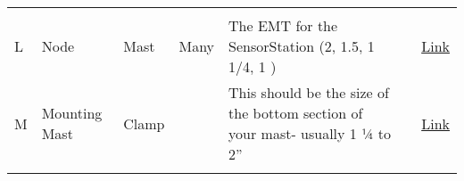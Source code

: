 \documentclass[
]{article}
\begin{document}
\begin{longtable}[]{@{}lllllll@{}}
\begin{minipage}[t]{0.12\columnwidth}
\end{minipage}\tabularnewline
\begin{minipage}[t]{0.12\columnwidth}\raggedright
L\strut
\end{minipage} & \begin{minipage}[t]{0.12\columnwidth}\raggedright
Node\strut
\end{minipage} & \begin{minipage}[t]{0.12\columnwidth}\raggedright
Mast\strut
\end{minipage} & \begin{minipage}[t]{0.12\columnwidth}\raggedright
Many\strut
\end{minipage} & \begin{minipage}[t]{0.12\columnwidth}\raggedright
The EMT for the SensorStation (2, 1.5, 1 1/4, 1 )\strut
\end{minipage} & \begin{minipage}[t]{0.12\columnwidth}\raggedright
\strut
\end{minipage} & \begin{minipage}[t]{0.12\columnwidth}\raggedright
\href{https://www.lowes.com/pd/Common-3-4-in-Actual-75-In-Metallic-Emt-10-ft-Conduit/3129553}{Link}\strut
\end{minipage}\tabularnewline
\begin{minipage}[t]{0.12\columnwidth}\raggedright
M\strut
\end{minipage} & \begin{minipage}[t]{0.12\columnwidth}\raggedright
Mounting Mast\strut
\end{minipage} & \begin{minipage}[t]{0.12\columnwidth}\raggedright
Clamp\strut
\end{minipage} & \begin{minipage}[t]{0.12\columnwidth}\raggedright
\strut
\end{minipage} & \begin{minipage}[t]{0.12\columnwidth}\raggedright
This should be the size of the bottom section of your mast- usually 1 ¼
to 2''\strut
\end{minipage} & \begin{minipage}[t]{0.12\columnwidth}\raggedright
\strut
\end{minipage} & \begin{minipage}[t]{0.12\columnwidth}\raggedright
\href{https://www.lowes.com/search?searchTerm=universal+strut+pipe+strap}{Link}\strut
\end{minipage}\tabularnewline
\begin{minipage}[t]{0.12\columnwidth}\raggedright

\end{minipage}
\end{longtable}
\end{document}
